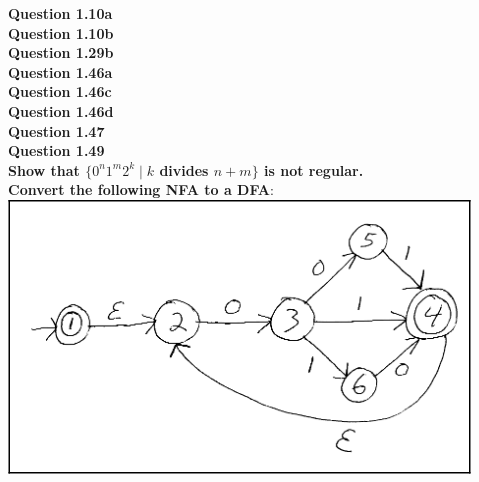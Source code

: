 \documentclass{article}
\begin{document}
    \noindent\textbf{Question 1.10a}\\
    \textbf{Question 1.10b}\\
    \textbf{Question 1.29b}\\
    \textbf{Question 1.46a}\\
    \textbf{Question 1.46c}\\
    \textbf{Question 1.46d}\\
    \textbf{Question 1.47}\\
    \textbf{Question 1.49}\\
    \textbf{Show that $\{0^n1^m2^k\mid k$ divides $n+m\}$ is not regular.}\\
    \textbf{Convert the following NFA to a DFA}:\\
    \includegraphics[scale=0.75]{machine}
\end{document}
